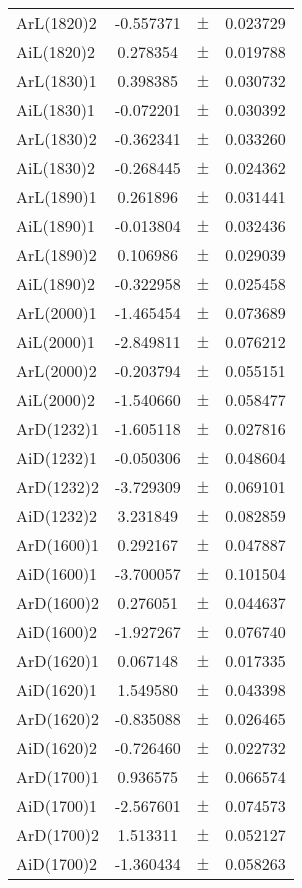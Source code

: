 \begin{table}
\begin{tiny}
\begin{tabular}{lccc}
ArL(1820)2 & -0.557371 & $\pm$ & 0.023729 \\
AiL(1820)2 & 0.278354 & $\pm$ & 0.019788 \\
ArL(1830)1 & 0.398385 & $\pm$ & 0.030732 \\
AiL(1830)1 & -0.072201 & $\pm$ & 0.030392 \\
ArL(1830)2 & -0.362341 & $\pm$ & 0.033260 \\
AiL(1830)2 & -0.268445 & $\pm$ & 0.024362 \\
ArL(1890)1 & 0.261896 & $\pm$ & 0.031441 \\
AiL(1890)1 & -0.013804 & $\pm$ & 0.032436 \\
ArL(1890)2 & 0.106986 & $\pm$ & 0.029039 \\
AiL(1890)2 & -0.322958 & $\pm$ & 0.025458 \\
ArL(2000)1 & -1.465454 & $\pm$ & 0.073689 \\
AiL(2000)1 & -2.849811 & $\pm$ & 0.076212 \\
ArL(2000)2 & -0.203794 & $\pm$ & 0.055151 \\
AiL(2000)2 & -1.540660 & $\pm$ & 0.058477 \\
ArD(1232)1 & -1.605118 & $\pm$ & 0.027816 \\
AiD(1232)1 & -0.050306 & $\pm$ & 0.048604 \\
ArD(1232)2 & -3.729309 & $\pm$ & 0.069101 \\
AiD(1232)2 & 3.231849 & $\pm$ & 0.082859 \\
ArD(1600)1 & 0.292167 & $\pm$ & 0.047887 \\
AiD(1600)1 & -3.700057 & $\pm$ & 0.101504 \\
ArD(1600)2 & 0.276051 & $\pm$ & 0.044637 \\
AiD(1600)2 & -1.927267 & $\pm$ & 0.076740 \\
ArD(1620)1 & 0.067148 & $\pm$ & 0.017335 \\
AiD(1620)1 & 1.549580 & $\pm$ & 0.043398 \\
ArD(1620)2 & -0.835088 & $\pm$ & 0.026465 \\
AiD(1620)2 & -0.726460 & $\pm$ & 0.022732 \\
ArD(1700)1 & 0.936575 & $\pm$ & 0.066574 \\
AiD(1700)1 & -2.567601 & $\pm$ & 0.074573 \\
ArD(1700)2 & 1.513311 & $\pm$ & 0.052127 \\
AiD(1700)2 & -1.360434 & $\pm$ & 0.058263 \\
\bottomrule
\end{tabular}
\end{tiny}
\end{table}

